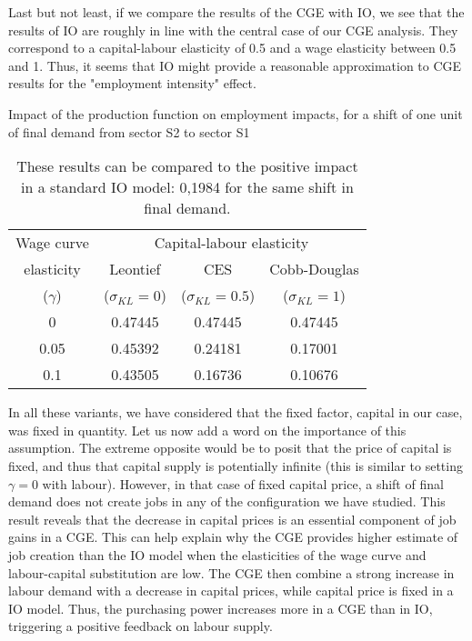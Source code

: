 Last but not least, if we compare the results of the CGE with IO, we see that the results of IO are roughly in line with the central case of our CGE analysis. They correspond to a capital-labour elasticity of 0.5 and a wage elasticity between 0.5 and 1. 
Thus, it seems that IO might provide a reasonable approximation to CGE results for the "employment intensity" effect.

\begin{table} [!h]
	\centering
	\caption{Impact of the production function on employment impacts, for a shift of one unit of final demand from sector S2 to sector S1}
	\label{tab:employ_change_closed}
	\begin{tabular}{c|ccc}
		\toprule
		Wage curve & \multicolumn{3}{c}{Capital-labour elasticity} \\
		elasticity & Leontief & CES & Cobb-Douglas \\
		($\gamma$)  &($\sigma_{KL}=0$) & ($\sigma_{KL}=0.5$) & ($\sigma_{KL}=1$) \\
		\midrule
		0 			  & 0.47445 & 0.47445 & 0.47445 \\ 
		0.05		& 0.45392 & 0.24181 & 0.17001 \\
		0.1 	 	 & 0.43505 & 0.16736 & 0.10676 \\
		\bottomrule
	\end{tabular}
	\caption*{These results can be compared to the positive impact in a standard IO model: 0,1984 for the same shift in final demand.}
\end{table}

In all these variants, we have considered that the fixed factor, capital in our case, was fixed in quantity.
Let us now add a word on the importance of this assumption. The extreme opposite would be to posit that the price of capital is fixed, and thus that capital supply is potentially infinite (this is similar to setting $\gamma=0$ with labour).
However, in that case of fixed capital price, a shift of final demand does not create jobs in any of the configuration we have studied.
This result reveals that the decrease in capital prices is an essential component of job gains in a CGE.	
This can help explain why the CGE provides higher estimate of job creation than the IO model when the elasticities of the wage curve and labour-capital substitution are low. The CGE then combine a strong increase in labour demand with a decrease in capital prices, while capital price is fixed in a IO model. 
Thus, the purchasing power increases more in a CGE than in IO, triggering a positive feedback on labour supply.

